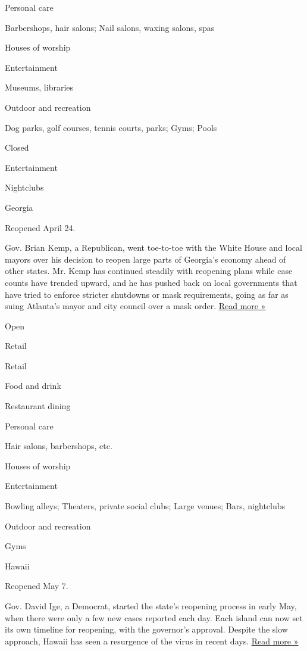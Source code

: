 Personal care

Barbershops, hair salons; Nail salons, waxing salons, spas

Houses of worship

Entertainment

Museums, libraries

Outdoor and recreation

Dog parks, golf courses, tennis courts, parks; Gyms; Pools

Closed

Entertainment

Nightclubs

Georgia

Reopened April 24.

Gov. Brian Kemp, a Republican, went toe-to-toe with the White House and
local mayors over his decision to reopen large parts of Georgia's
economy ahead of other states. Mr. Kemp has continued steadily with
reopening plans while case counts have trended upward, and he has pushed
back on local governments that have tried to enforce stricter shutdowns
or mask requirements, going as far as suing Atlanta's mayor and city
council over a mask order.
\href{https://www.ledger-enquirer.com/news/coronavirus/article244285992.html}{Read
more »}

Open

Retail

Retail

Food and drink

Restaurant dining

Personal care

Hair salons, barbershops, etc.

Houses of worship

Entertainment

Bowling alleys; Theaters, private social clubs; Large venues; Bars,
nightclubs

Outdoor and recreation

Gyms

Hawaii

Reopened May 7.

Gov. David Ige, a Democrat, started the state's reopening process in
early May, when there were only a few new cases reported each day. Each
island can now set its own timeline for reopening, with the governor's
approval. Despite the slow approach, Hawaii has seen a resurgence of the
virus in recent days.
\href{https://www.bigislandvideonews.com/2020/06/04/hawaii-economic-reopening-strategy-posted-online/}{Read
more »}


